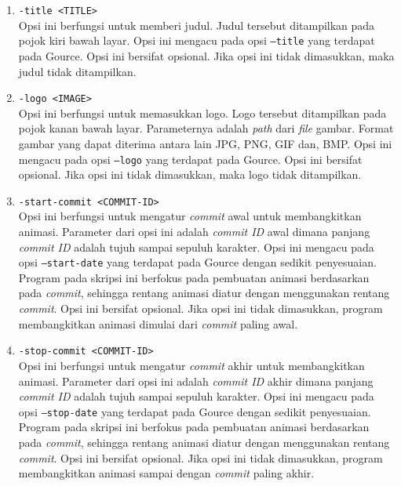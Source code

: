 \begin{enumerate}
\item \texttt{-title <TITLE>}\\
Opsi ini berfungsi untuk memberi judul. Judul tersebut ditampilkan pada pojok kiri
bawah layar. Opsi ini mengacu pada opsi \texttt{--title} yang terdapat pada Gource. Opsi ini bersifat opsional. Jika opsi ini tidak dimasukkan, maka judul tidak ditampilkan.  

\item \texttt{-logo <IMAGE>}\\
Opsi ini berfungsi untuk memasukkan logo. Logo tersebut ditampilkan pada pojok kanan
bawah layar. Parameternya adalah \textit{path} dari \textit{file} gambar. Format gambar yang dapat diterima antara lain JPG, PNG, GIF dan, BMP. Opsi ini mengacu pada opsi \texttt{--logo} yang terdapat pada Gource. Opsi ini bersifat opsional. Jika opsi ini tidak dimasukkan, maka logo tidak ditampilkan.


\item \texttt{-start-commit <COMMIT-ID>}\\
Opsi ini berfungsi untuk mengatur \textit{commit} awal untuk membangkitkan animasi. Parameter dari opsi ini adalah \textit{commit ID} awal dimana panjang \textit{commit ID} adalah tujuh sampai sepuluh karakter. Opsi ini mengacu pada opsi \texttt{--start-date} yang terdapat pada Gource dengan sedikit penyesuaian. Program pada skripsi ini berfokus pada pembuatan animasi berdasarkan pada \textit{commit}, sehingga rentang animasi diatur dengan menggunakan rentang \textit{commit}. Opsi ini bersifat opsional. Jika opsi ini tidak dimasukkan, program membangkitkan animasi dimulai dari \textit{commit} paling awal.
\item \texttt{-stop-commit <COMMIT-ID>}\\
Opsi ini berfungsi untuk mengatur \textit{commit} akhir untuk membangkitkan animasi. Parameter dari opsi ini adalah \textit{commit ID} akhir dimana panjang \textit{commit ID} adalah tujuh sampai sepuluh karakter. Opsi ini mengacu pada opsi \texttt{--stop-date} yang terdapat pada Gource dengan sedikit penyesuaian. Program pada skripsi ini berfokus pada pembuatan animasi berdasarkan pada \textit{commit}, sehingga rentang animasi diatur dengan menggunakan rentang \textit{commit}. Opsi ini bersifat opsional. Jika opsi ini tidak dimasukkan, program membangkitkan animasi sampai dengan \textit{commit} paling akhir.


\end{enumerate}
